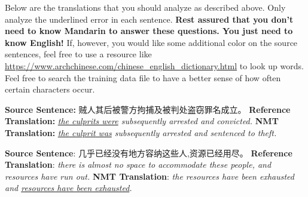 \begin{parts}
    Below are the translations that you should analyze as described above. Only analyze the underlined error in each sentence. {\bf Rest assured that you don't need to know Mandarin to answer these questions. You just need to know English!} If, however, you would like some additional color on the source sentences, feel free to use a resource like \url{https://www.archchinese.com/chinese_english_dictionary.html} to look up words. Feel free to search the training data file to have a better sense of how often certain characters occur.

    \begin{subparts}
        \subpart[2]
        \textbf{Source Sentence:} 贼人其后被警方拘捕及被判处盗窃罪名成立。 \newline
        \textbf{Reference Translation:} \textit{\underline{the culprits were} subsequently arrested and convicted.}\newline
        \textbf{NMT Translation:} \textit{\underline{the culprit was} subsequently arrested and sentenced to theft.}
        


        \subpart[2]
        \textbf{Source Sentence}: 几乎已经没有地方容纳这些人,资源已经用尽。\newline
        \textbf{Reference Translation}: \textit{there is almost no space to accommodate these people, and resources have run out.   }\newline
        \textbf{NMT Translation}: \textit{the resources have been exhausted and \underline{resources have been exhausted}.}
        


\end{subparts}
\end{parts}
